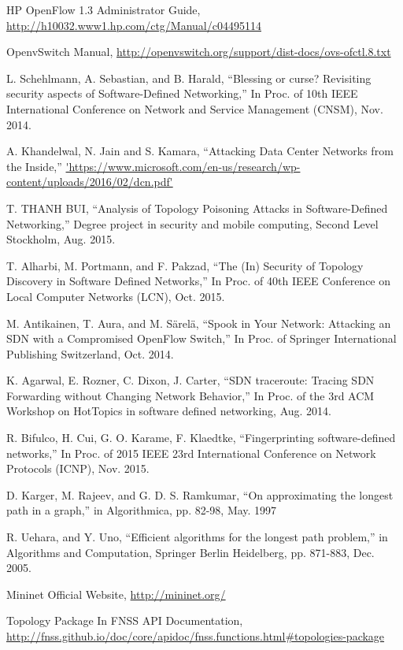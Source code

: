 \begin{thebibliography}{1}
HP OpenFlow 1.3 Administrator Guide, \url{http://h10032.www1.hp.com/ctg/Manual/c04495114}

OpenvSwitch Manual, \url{http://openvswitch.org/support/dist-docs/ovs-ofctl.8.txt}

L. Schehlmann, A. Sebastian, and B. Harald, 
``Blessing or curse? Revisiting security aspects of Software-Defined Networking,'' In Proc. of 10th IEEE International Conference on Network and Service Management (CNSM), Nov. 2014.

A. Khandelwal, N. Jain and S. Kamara,
``Attacking Data Center Networks from the Inside,'' \url{'https://www.microsoft.com/en-us/research/wp-content/uploads/2016/02/dcn.pdf'} 

T. THANH BUI,
``Analysis of Topology Poisoning Attacks in Software-Defined Networking,'' Degree project in security and mobile computing, Second Level Stockholm, Aug. 2015.

T. Alharbi, M. Portmann, and F. Pakzad,
``The (In) Security of Topology Discovery in Software Defined Networks,'' In Proc. of 40th IEEE Conference on Local Computer Networks (LCN), Oct. 2015.

M. Antikainen, T. Aura, and M. Särelä,
``Spook in Your Network: Attacking an SDN with a Compromised OpenFlow Switch,'' In Proc. of Springer International Publishing Switzerland, Oct. 2014.

K. Agarwal, E. Rozner, C. Dixon, J. Carter,
``SDN traceroute: Tracing SDN Forwarding without Changing Network Behavior,'' In Proc. of the 3rd ACM Workshop on HotTopics in software defined networking, Aug. 2014.

R. Bifulco, H. Cui, G. O. Karame, F. Klaedtke,
``Fingerprinting software-defined networks,'' In Proc. of 2015 IEEE 23rd International Conference on Network Protocols (ICNP), Nov. 2015.

D. Karger, M. Rajeev, and G. D. S. Ramkumar,
``On approximating the longest path in a graph,'' in Algorithmica, pp. 82-98, May. 1997

R. Uehara, and Y. Uno,
``Efficient algorithms for the longest path problem,'' in Algorithms and Computation, Springer Berlin Heidelberg, pp. 871-883, Dec. 2005.


Mininet Official Website, \url{http://mininet.org/}

Topology Package In FNSS API Documentation, \url{http://fnss.github.io/doc/core/apidoc/fnss.functions.html#topologies-package}


\end{thebibliography}
